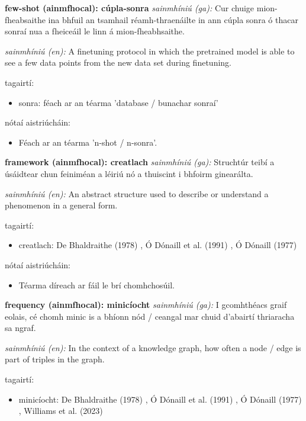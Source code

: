 \documentclass{article}
\begin{document}
\textbf{few-shot (ainmfhocal): cúpla-sonra}
\textit{sainmhíniú (ga):} Cur chuige mion-fheabsaithe ina bhfuil an tsamhail réamh-thraenáilte in ann cúpla sonra ó thacar sonraí nua a fheiceáil le linn á mion-fheabhsaithe.

\textit{sainmhíniú (en):} A finetuning protocol in which the pretrained model is able to see a few data points from the new data set during finetuning.

tagairtí:
\begin{itemize}
	\item sonra: féach ar an téarma 'database / bunachar sonraí'
\end{itemize}

nótaí aistriúcháin:
\begin{itemize}
	\item Féach ar an téarma 'n-shot / n-sonra'.
\end{itemize}


\textbf{framework (ainmfhocal): creatlach}
\textit{sainmhíniú (ga):} Struchtúr teibí a úsáidtear chun feiniméan a léiriú nó a thuiscint i bhfoirm ginearálta.

\textit{sainmhíniú (en):} An abstract structure used to describe or understand a phenomenon in a general form.

tagairtí:
\begin{itemize}
	\item creatlach: De Bhaldraithe (1978) \cite{de-bhaldraithe}, Ó Dónaill et al. (1991) \cite{focloir-beag}, Ó Dónaill (1977) \cite{odonaill}
\end{itemize}

nótaí aistriúcháin:
\begin{itemize}
	\item Téarma díreach ar fáil le brí chomhchosúil.
\end{itemize}


\textbf{frequency (ainmfhocal): minicíocht}
\textit{sainmhíniú (ga):} I gcomhthéacs graif eolais, cé chomh minic is a bhíonn nód / ceangal mar chuid d'abairtí thriaracha sa ngraf.

\textit{sainmhíniú (en):} In the context of a knowledge graph, how often a node / edge is part of triples in the graph.

tagairtí:
\begin{itemize}
	\item minicíocht: De Bhaldraithe (1978) \cite{de-bhaldraithe}, Ó Dónaill et al. (1991) \cite{focloir-beag}, Ó Dónaill (1977) \cite{odonaill}, Williams et al. (2023) \cite{storchiste}
\end{itemize}
\end{document}
